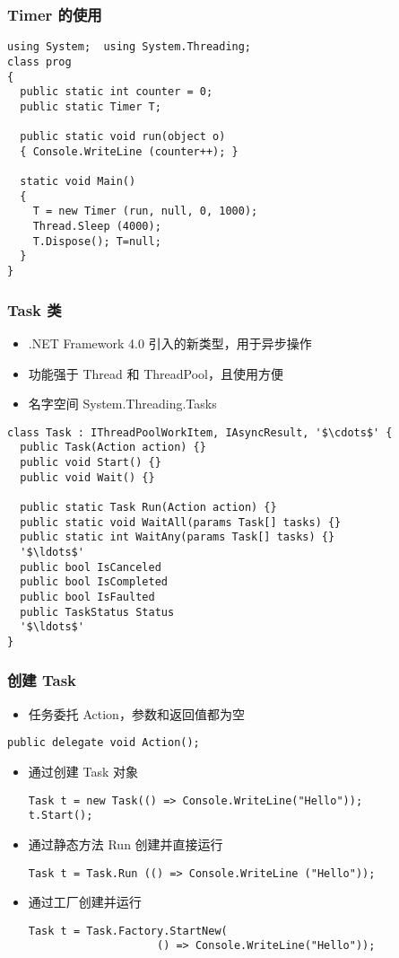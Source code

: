\begin{frame}[fragile]
\frametitle{Timer 的使用}
\begin{lstlisting}
using System;  using System.Threading;
class prog
{
  public static int counter = 0;
  public static Timer T;

  public static void run(object o)
  { Console.WriteLine (counter++); }

  static void Main()
  {
    T = new Timer (run, null, 0, 1000);
    Thread.Sleep (4000);
    T.Dispose(); T=null;
  }
}
\end{lstlisting}
\end{frame}

\begin{frame}[fragile]
\frametitle{Task 类}
\begin{itemize}
\item .NET Framework 4.0 引入的新类型，用于异步操作
\item 功能强于 Thread 和 ThreadPool，且使用方便
\item 名字空间 System.Threading.Tasks
\end{itemize}
\begin{lstlisting}[escapeinside='']
class Task : IThreadPoolWorkItem, IAsyncResult, '$\cdots$' {
  public Task(Action action) {}
  public void Start() {}
  public void Wait() {}

  public static Task Run(Action action) {}
  public static void WaitAll(params Task[] tasks) {}
  public static int WaitAny(params Task[] tasks) {}
  '$\ldots$'
  public bool IsCanceled
  public bool IsCompleted
  public bool IsFaulted
  public TaskStatus Status
  '$\ldots$'
}
\end{lstlisting}

\end{frame}

\begin{frame}[fragile]
\frametitle{创建 Task}
\begin{itemize}
\item 任务委托 Action，参数和返回值都为空
\end{itemize}
\begin{lstlisting}
public delegate void Action();
\end{lstlisting}
\begin{itemize}
\item 通过创建 Task 对象
\begin{lstlisting}
Task t = new Task(() => Console.WriteLine("Hello"));
t.Start();
\end{lstlisting}
\item 通过静态方法 Run 创建并直接运行
\begin{lstlisting}
Task t = Task.Run (() => Console.WriteLine ("Hello"));
\end{lstlisting}
\item 通过工厂创建并运行
\begin{lstlisting}
Task t = Task.Factory.StartNew(
                    () => Console.WriteLine("Hello"));

\end{lstlisting}
\end{itemize}
\end{frame}


